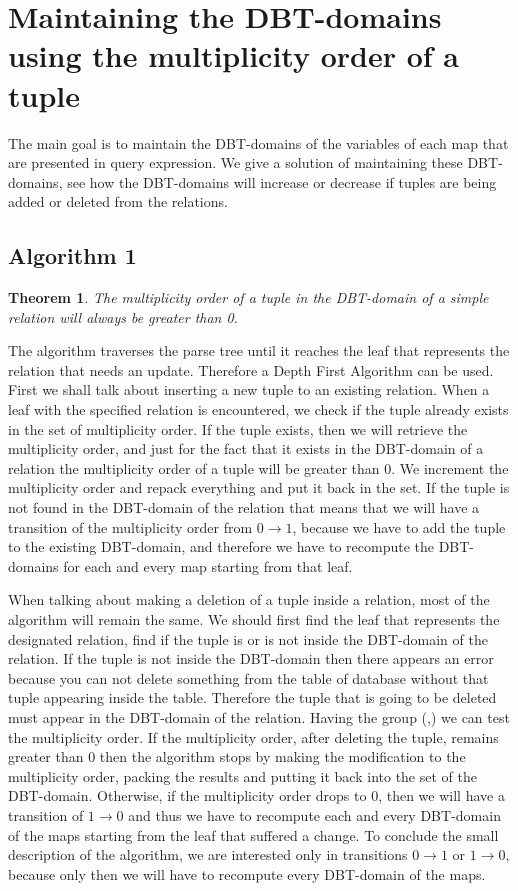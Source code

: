 \documentclass[12pt]{article}
\newtheorem{theorem}{Theorem}[section]
\begin{document}
\section{Maintaining the DBT-domains using the multiplicity order of a tuple}

The main goal is to maintain the DBT-domains of the variables of each map that are presented in query expression. We give a solution of maintaining these DBT-domains, see how the DBT-domains will increase or decrease if tuples are being added or deleted from the relations.
\subsection{Algorithm 1}
\begin{theorem}
The multiplicity order of a tuple in the DBT-domain of a simple relation will always be greater than 0.
\end{theorem}

The algorithm traverses the parse tree until it reaches the leaf that represents the relation that needs an update. Therefore a Depth First Algorithm can be used. First we shall talk about inserting a new tuple to an existing relation. When a leaf with the specified relation is encountered, we check if the tuple already exists in the set of multiplicity order. If the tuple exists, then we will retrieve the multiplicity order, and just for the fact that it exists in the DBT-domain of a relation the multiplicity order of a tuple will be greater than 0. We increment the multiplicity order and repack everything and put it back in the set. If the tuple is not found in the DBT-domain of the relation that means that we will have a transition of the multiplicity order from $0 \rightarrow 1$, because we have to add the tuple to the existing DBT-domain, and therefore we have to recompute the DBT-domains for each and every map starting from that leaf.

When talking about making a deletion of a tuple inside a relation, most of the algorithm will remain the same. We should first find the leaf that represents the designated relation, find if the tuple is or is not inside the DBT-domain of the relation. If the tuple is not inside the DBT-domain then there appears an error because you can not delete something from the table of database without that tuple appearing inside the table. Therefore the tuple that is going to be deleted must appear in the DBT-domain of the relation. Having the group (\dom{},\multip) we can test the multiplicity order. If the multiplicity order, after deleting the tuple, remains greater than 0 then the algorithm stops by making the modification to the multiplicity order, packing the results and putting it back into the set of the DBT-domain. Otherwise, if the multiplicity order drops to 0, then we will have a transition of $1 \rightarrow 0$ and thus we have to recompute each and every DBT-domain of the maps starting from the leaf that suffered a change.
To conclude the small description of the algorithm, we are interested only in transitions $0 \rightarrow 1$ or $1 \rightarrow 0$, because only then we will have to recompute every DBT-domain of the maps.
\end{document}
